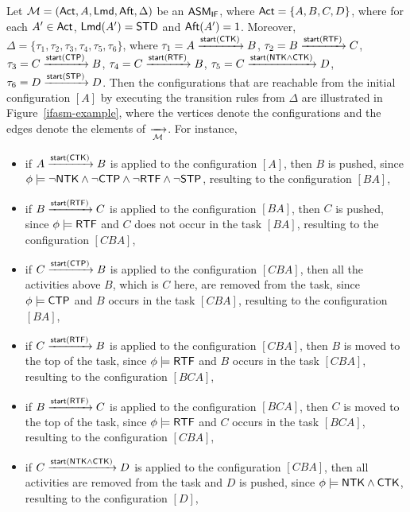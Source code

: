 \begin{example}
	Let ${\mathcal{M} } = ({\sf Act},A,{\sf Lmd},{\sf Aft},\Delta)$ be an $\textsf{ASM}_\textsf{IF}$, where ${\sf Act} = \{A,B,C,D\}$, where for each $A'\in{\sf Act}$, ${\sf Lmd}(A') = \mathsf{STD}$ and ${\sf Aft}(A') = 1$. 
	Moreover, $\Delta = \{\tau_1, \tau_2, \tau_3, \tau_4, \tau_5, \tau_6\}$, where 
			$\tau_1 = A \xrightarrow{{\mathsf{start} }({\sf CTK})} B$,
			$\tau_2 = B \xrightarrow{{\mathsf{start} }({\sf RTF})} C$,
			$\tau_3 = C \xrightarrow{{\mathsf{start} }({\sf CTP})} B$,
			$\tau_4 = C \xrightarrow{{\mathsf{start} }({\sf RTF})} B$,
			$\tau_5 = C \xrightarrow{{\mathsf{start} }({\sf NTK}\wedge{\sf CTK})} D$,
			$\tau_6 = D \xrightarrow{{\mathsf{start} }({\sf STP})} D$.
	Then the configurations that are reachable from the initial configuration $[A]$ by executing the transition rules from $\Delta$ are illustrated in Figure~\ref{ifasm-example}, where the vertices denote the configurations and the edges denote the elements of $\xrightarrow[{\mathcal{M} }]{}$. 
	For instance, 
	\begin{itemize}
	\item if $A \xrightarrow{{\mathsf{start} }({\sf CTK})} B$ is applied to the configuration $[A]$, then $B$ is pushed, since $\phi\models\neg{\sf NTK} \wedge \neg {\sf CTP} \wedge \neg {\sf RTF} \wedge \neg {\sf STP}$, resulting to the configuration $[BA]$,
	\item if $B \xrightarrow{{\mathsf{start} }({\sf RTF})} C$ is applied to the configuration $[BA]$, then $C$ is pushed, since $\phi\models{\sf RTF}$ and $C$ does not occur in the task $[BA]$, resulting to the configuration $[CBA]$,
	\item if $C \xrightarrow{{\mathsf{start} }({\sf CTP})} B$ is applied to the configuration $[CBA]$, then all the activities above $B$, which is $C$ here, are removed from the task, since $\phi\models{\sf CTP}$ and $B$ occurs in the task $[CBA]$, resulting to the configuration $[BA]$,
	\item if $C \xrightarrow{{\mathsf{start} }({\sf RTF})} B$ is applied to the configuration $[CBA]$, then $B$ is moved to the top of the task, since $\phi\models{\sf RTF}$ and $B$ occurs in the task $[CBA]$, resulting to the configuration $[BCA]$,
	\item if $B \xrightarrow{{\mathsf{start} }({\sf RTF})} C$ is applied to the configuration $[BCA]$, then $C$ is moved to the top of the task, since $\phi\models{\sf RTF}$ and $C$ occurs in the task $[BCA]$, resulting to the configuration $[CBA]$,
	\item if $C \xrightarrow{{\mathsf{start} }({\sf NTK}\wedge{\sf CTK})} D$ is applied to the configuration $[CBA]$, then all activities are removed from the task and $D$ is pushed, since $\phi\models{\sf NTK}\wedge{\sf CTK}$, resulting to the configuration $[D]$,

\end{itemize}
\end{example}
